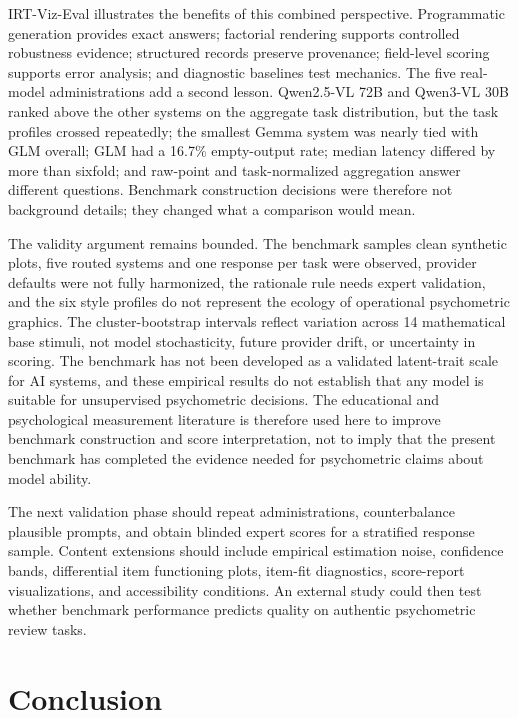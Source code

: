 \documentclass[12pt]{article}
\begin{document}
IRT-Viz-Eval illustrates the benefits of this combined perspective. Programmatic generation provides exact answers; factorial rendering supports controlled robustness evidence; structured records preserve provenance; field-level scoring supports error analysis; and diagnostic baselines test mechanics. The five real-model administrations add a second lesson. Qwen2.5-VL 72B and Qwen3-VL 30B ranked above the other systems on the aggregate task distribution, but the task profiles crossed repeatedly; the smallest Gemma system was nearly tied with GLM overall; GLM had a 16.7\% empty-output rate; median latency differed by more than sixfold; and raw-point and task-normalized aggregation answer different questions. Benchmark construction decisions were therefore not background details; they changed what a comparison would mean.

The validity argument remains bounded. The benchmark samples clean synthetic plots, five routed systems and one response per task were observed, provider defaults were not fully harmonized, the rationale rule needs expert validation, and the six style profiles do not represent the ecology of operational psychometric graphics. The cluster-bootstrap intervals reflect variation across 14 mathematical base stimuli, not model stochasticity, future provider drift, or uncertainty in scoring. The benchmark has not been developed as a validated latent-trait scale for AI systems, and these empirical results do not establish that any model is suitable for unsupervised psychometric decisions. The educational and psychological measurement literature is therefore used here to improve benchmark construction and score interpretation, not to imply that the present benchmark has completed the evidence needed for psychometric claims about model ability.

The next validation phase should repeat administrations, counterbalance plausible prompts, and obtain blinded expert scores for a stratified response sample. Content extensions should include empirical estimation noise, confidence bands, differential item functioning plots, item-fit diagnostics, score-report visualizations, and accessibility conditions. An external study could then test whether benchmark performance predicts quality on authentic psychometric review tasks.

\section{Conclusion}
\end{document}
